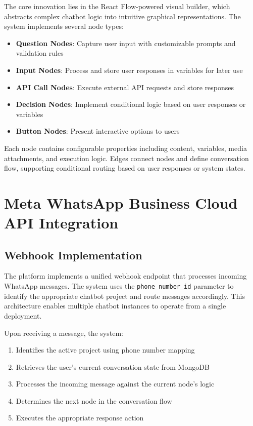 \documentclass[conference]{IEEEtran}
\begin{document}
The core innovation lies in the React Flow-powered visual builder, which abstracts complex chatbot logic into intuitive graphical representations. The system implements several node types:

\begin{itemize}
\item \textbf{Question Nodes}: Capture user input with customizable prompts and validation rules
\item \textbf{Input Nodes}: Process and store user responses in variables for later use
\item \textbf{API Call Nodes}: Execute external API requests and store responses
\item \textbf{Decision Nodes}: Implement conditional logic based on user responses or variables
\item \textbf{Button Nodes}: Present interactive options to users
\end{itemize}

Each node contains configurable properties including content, variables, media attachments, and execution logic. Edges connect nodes and define conversation flow, supporting conditional routing based on user responses or system states.

\section{Meta WhatsApp Business Cloud API Integration}

\subsection{Webhook Implementation}

The platform implements a unified webhook endpoint that processes incoming WhatsApp messages. The system uses the \texttt{phone\_number\_id} parameter to identify the appropriate chatbot project and route messages accordingly. This architecture enables multiple chatbot instances to operate from a single deployment.

Upon receiving a message, the system:
\begin{enumerate}
\item Identifies the active project using phone number mapping
\item Retrieves the user's current conversation state from MongoDB
\item Processes the incoming message against the current node's logic
\item Determines the next node in the conversation flow
\item Executes the appropriate response action
\end{enumerate}
\end{document}
